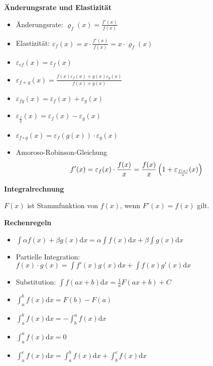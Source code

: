 \documentclass[10pt,landscape,a4paper]{article}
\begin{document}
\begin{multicols*}{4}
\textbf{Änderungsrate und Elastizität}
\begin{itemize}
	\item Änderungsrate: $\varrho_f(x)=\frac{f'(x)}{f(x)}$
	\item Elastizität: $\varepsilon_f(x)=x\cdot\frac{f'(x)}{f(x)}=x\cdot\varrho_f(x)$
	\item $\varepsilon_{cf}(x)=\varepsilon_f(x)$
	\item $\varepsilon_{f+g}(x)=\frac{f(x)\varepsilon_f(x) + g(x)\varepsilon_g(x)}{f(x)+g(x)}$
	\item $\varepsilon_{fg}(x)=\varepsilon_f(x) + \varepsilon_g(x)$
	\item $\varepsilon_{\frac{f}{g}}(x)=\varepsilon_f(x)-\varepsilon_g(x)$
	\item $\varepsilon_{f\circ g}(x)=\varepsilon_f(g(x))\cdot \varepsilon_g(x)$
	\item Amoroso-Robinson-Gleichung
	\begin{align}
		f'(x) = \varepsilon_f(x) \cdot\frac{f(x)}{x} = \frac{f(x)}{x}\left(1+\varepsilon_{\frac{f(x)}{x}}(x)\right) \notag
	\end{align}
\end{itemize}

\begin{center}
	\normalsize{\textbf{Integralrechnung}}
\end{center}
$F(x)$ ist Stammfunktion von $f(x)$, wenn $F'(x)=f(x)$ gilt.

\textbf{Rechenregeln}
\begin{itemize}
	\item $\int \alpha f(x) + \beta g(x) \mathrm{d}x = \alpha\int f(x)\mathrm{d}x + \beta\int g(x)\mathrm{d}x$
	\item Partielle Integration: $f(x)\cdot g(x)=\int f'(x)g(x)\mathrm{d}x + \int f(x)g'(x)\mathrm{d}x$
	\item Substitution: $\int f(ax+b)\mathrm{d}x = \frac{1}{a}F(ax+b)+C$
	\item $\int_a^b f(x)\mathrm{d}x = F(b)-F(a)$
	\item $\int_a^b f(x)\mathrm{d}x = -\int_b^a f(x) \mathrm{d}x$
	\item $\int_a^a f(x)\mathrm{d}x = 0$
	\item $\int_a^c f(x)\mathrm{d}x = \int_a^b f(x)\mathrm{d}x + \int_b^c f(x)\mathrm{d}x$
\end{itemize}


\end{multicols*}
\end{document}
